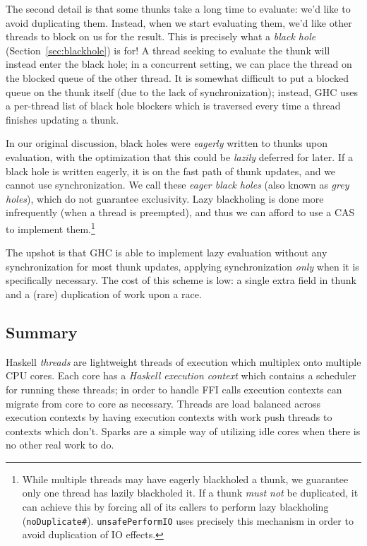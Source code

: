 The second detail is that some thunks take a long time to evaluate: we'd
like to avoid duplicating them.  Instead, when we start evaluating them,
we'd like other threads to block on us for the result.  This is
precisely what a \emph{black hole} (Section~\ref{sec:blackhole}) is for!
A thread seeking to evaluate the thunk will instead enter the black
hole; in a concurrent setting, we can place the thread on the blocked
queue of the other thread.  It is somewhat difficult to put a blocked
queue on the thunk itself (due to the lack of synchronization); instead,
GHC uses a per-thread list of black hole blockers which is traversed
every time a thread finishes updating a thunk.

In our original discussion, black holes were \emph{eagerly} written to
thunks upon evaluation, with the optimization that this could be
\emph{lazily} deferred for later.  If a black hole is written eagerly,
it is on the fast path of thunk updates, and we cannot use
synchronization.  We call these \emph{eager black holes} (also known as
\emph{grey holes}), which do not guarantee exclusivity.  Lazy blackholing is done more infrequently (when a thread is preempted), and thus
we can afford to use a CAS to implement them.\footnote{While multiple
    threads may have eagerly blackholed a thunk, we guarantee only one
    thread has lazily blackholed it.  If a thunk \emph{must not} be
duplicated, it can achieve this by forcing all of its callers to perform
lazy blackholing
(\texttt{noDuplicate\#}).  \texttt{unsafePerformIO} uses precisely
this mechanism in order to avoid duplication of IO effects.}

The upshot is that GHC is able to implement lazy evaluation without any
synchronization for most thunk updates, applying synchronization
\emph{only} when it is specifically necessary. The cost of this scheme
is low: a single extra field in thunk and a (rare) duplication of work
upon a race.

\subsection{Summary}

Haskell \emph{threads} are lightweight threads of execution which
multiplex onto multiple CPU cores.  Each core has a \emph{Haskell
execution context} which contains a scheduler for running these threads;
in order to handle FFI calls execution contexts can migrate from core to
core as necessary.  Threads are load balanced across execution contexts
by having execution contexts with work push threads to contexts which
don't.  Sparks are a simple way of utilizing idle cores when there is no
other real work to do.

